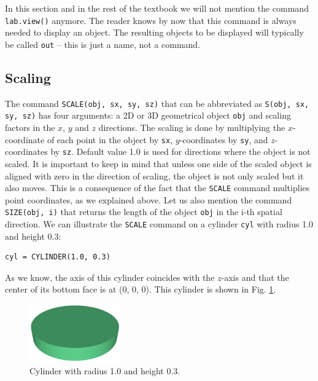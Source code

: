 \begin{gbox}
In this section and in the rest of the textbook we will not mention the command
{\tt lab.view()} anymore. The reader knows by now that this command is always needed 
to display an object. The resulting objects to be displayed will 
typically be called {\tt out} -- this is just a name, not a command.
\end{gbox}


\subsection{Scaling}

The command {\tt SCALE(obj, sx, sy, sz)} that can be abbreviated as 
{\tt S(obj, sx, sy, sz)} has four arguments: a 2D or 3D geometrical object {\tt obj} 
and scaling factors in the $x$, $y$ and $z$ directions. The scaling is done by
multiplying the $x$-coordinate of each point in the object by {\tt sx}, $y$-coordinates
by {\tt sy}, and $z$-coordinates by {\tt sz}. Default value 1.0 is used for directions where 
the object is not scaled. It is important to keep in mind that unless 
one side of the scaled object is aligned with zero in the direction of scaling, 
the object is not only scaled but it also moves. This is a consequence of the 
fact that the {\tt SCALE} command multiplies point coordinates, as we explained above. 
Let us also mention the command {\tt SIZE(obj, i)} that returns the length of 
the object {\tt obj} in the i-th spatial direction.
We can illustrate the {\tt SCALE} command on a cylinder {\tt cyl} with radius 1.0 
and height 0.3:\\

\begin{bbox}
\begin{verbatim}
cyl = CYLINDER(1.0, 0.3)
\end{verbatim}
\end{bbox}
\vspace{6mm}

\noindent
As we know, the axis of this cylinder coincides with the $z$-axis 
and that the center of its bottom face is at (0, 0, 0). This cylinder is shown 
in Fig. \ref{fig:scale-0}.
\newpage

\begin{figure}[!ht]
\begin{center}
\includegraphics[width=0.35\textwidth]{img/scale-0.png}
\end{center}
\vspace{-4mm}
\caption{Cylinder with radius 1.0 and height 0.3.}
\label{fig:scale-0}
\end{figure}

